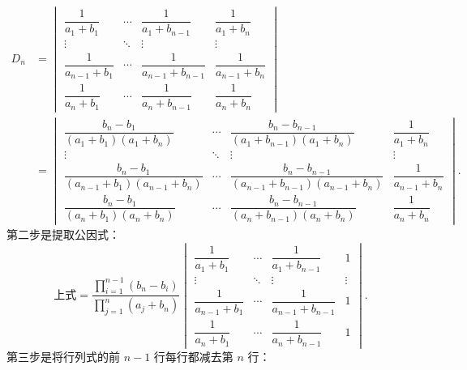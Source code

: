 \begin{solution}
    \begin{align*}
        D_n & = \begin{vmatrix}
                    \dfrac{1}{a_1+b_1}     & \cdots & \dfrac{1}{a_1+b_{n-1}}     & \dfrac{1}{a_1+b_n}     \\[2ex]
                    \vdots                 & \ddots & \vdots                     & \vdots                 \\[2ex]
                    \dfrac{1}{a_{n-1}+b_1} & \cdots & \dfrac{1}{a_{n-1}+b_{n-1}} & \dfrac{1}{a_{n-1}+b_n} \\[2ex]
                    \dfrac{1}{a_n+b_1}     & \cdots & \dfrac{1}{a_n+b_{n-1}}     & \dfrac{1}{a_n+b_n}
                \end{vmatrix}                                                                       \\[2ex]
            & = \begin{vmatrix}
                    \dfrac{b_n-b_1}{(a_1+b_1)(a_1+b_n)}         & \cdots & \dfrac{b_n-b_{n-1}}{(a_1+b_{n-1})(a_1+b_n)}         & \dfrac{1}{a_1+b_n}     \\[2ex]
                    \vdots                                      & \ddots & \vdots                                              & \vdots                 \\[2ex]
                    \dfrac{b_n-b_1}{(a_{n-1}+b_1)(a_{n-1}+b_n)} & \cdots & \dfrac{b_n-b_{n-1}}{(a_{n-1}+b_{n-1})(a_{n-1}+b_n)} & \dfrac{1}{a_{n-1}+b_n} \\[2ex]
                    \dfrac{b_n-b_1}{(a_n+b_1)(a_n+b_n)}         & \cdots & \dfrac{b_n-b_{n-1}}{(a_n+b_{n-1})(a_n+b_n)}         & \dfrac{1}{a_n+b_n}
                \end{vmatrix}.
    \end{align*}
    第二步是提取公因式：
    \[ \text{上式} = \dfrac{\prod\limits_{i=1}^{n-1}(b_n-b_i)}{\prod\limits_{j=1}^{n}(a_j+b_n)}
        \begin{vmatrix}
            \dfrac{1}{a_1+b_1}     & \cdots & \dfrac{1}{a_1+b_{n-1}}     & 1      \\[2ex]
            \vdots                 & \ddots & \vdots                     & \vdots \\[2ex]
            \dfrac{1}{a_{n-1}+b_1} & \cdots & \dfrac{1}{a_{n-1}+b_{n-1}} & 1      \\[2ex]
            \dfrac{1}{a_n+b_1}     & \cdots & \dfrac{1}{a_n+b_{n-1}}     & 1
        \end{vmatrix}. \]
    第三步是将行列式的前 $n-1$ 行每行都减去第 $n$ 行：

\end{solution}

